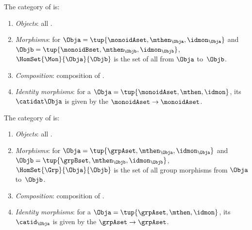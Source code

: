 \begin{ctdefinition}
    \label{def:Mon}
    The category \Mon of  is:
    \begin{enumerate}
        \item \emph{Objects}: all .
        \item \emph{Morphisms}: for  $\Obja = \tup{\monoidAset, \mthen_\Obja, \idmon_\Obja}$ and $\Objb = \tup{\monoidBset, \mthen_\Objb, \idmon_\Objb}$,  \linebreak $\HomSet{\Mon}{\Obja}{\Objb}$ is the set of all  from $\Obja$ to~$\Objb$.
        \item \emph{Composition}: composition of .
        \item \emph{Identity morphisms}: for a  $\Obja = \tup{\monoidAset, \mthen, \idmon}$, its  $\catidat\Obja$ is given by the  $\monoidAset \to \monoidAset$.
    \end{enumerate}
\end{ctdefinition}
\begin{ctdefinition}
    \label{def:Grp}
    The category \Grp of  is:
    \begin{enumerate}
        \item \emph{Objects}: all .
        \item \emph{Morphisms}: for  $\Obja = \tup{\grpAset, \mthen_\Obja, \idmon_\Obja}$ and $\Objb = \tup{\grpBset, \mthen_\Objb, \idmon_\Objb}$,  \linebreak $\HomSet{\Grp}{\Obja}{\Objb}$ is the set of all group morphisms from $\Obja$ to~$\Objb$.
        \item \emph{Composition}: composition of .
        \item \emph{Identity morphisms}: for a  $\Obja = \tup{\grpAset, \mthen, \idmon}$, its  $\catid_\Obja$ is given by the  $\grpAset \to \grpAset$.
    \end{enumerate}
\end{ctdefinition}
